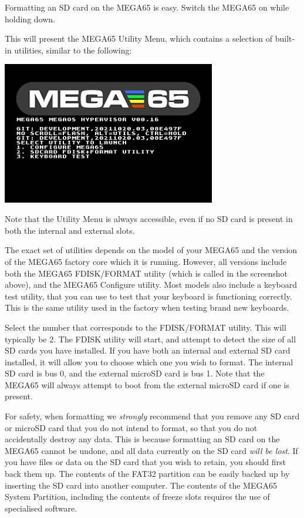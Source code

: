 Formatting an SD card on the MEGA65 is easy. Switch the MEGA65 on while holding  down.

This will present the MEGA65 Utility Menu, which contains a
selection of built-in utilities, similar to the following:

\begin{center}
\includegraphics[width=0.7\textwidth]{images/ss-utilmenu.png}
\end{center}

Note that the Utility Menu is always accessible, even if no SD card is present in both the internal and external slots.

The exact set of utilities
depends on the model of your MEGA65 and the version of the MEGA65
factory core which it is running. However, all versions include both
the MEGA65 FDISK/FORMAT utility (which is called  in the screenshot above),
and the MEGA65 Configure utility.
Most models also include a keyboard test utility, that you can use
to test that your keyboard is functioning correctly.  This is
the same utility used in the factory when testing brand
new keyboards.

Select the number that corresponds to the FDISK/FORMAT utility.  This
will typically be 2.  The FDISK utility will start, and attempt to
detect the size of all SD cards you have installed.  If you have both
an internal and external SD card installed, it will allow you to
choose which one you wish to format. The internal SD card is bus 0,
and the external microSD card is bus 1. Note that the MEGA65 will
always attempt to boot from the external microSD card if one is
present.

For safety, when formatting we {\em strongly} recommend
that you remove any SD card or microSD card that you do not intend to
format, so that you do not accidentally destroy any data.  This is
because formatting an SD card on the MEGA65 cannot be undone, and
all data currently on the SD card {\em will be lost}.  If you
have files or data on the SD card that you wish to retain, you
should first back them up.  The contents of the FAT32
partition can be easily backed up by inserting the SD card into
another computer.  The contents of the MEGA65 System Partition,
including the contents of freeze slots requires the use of specialised
software.


